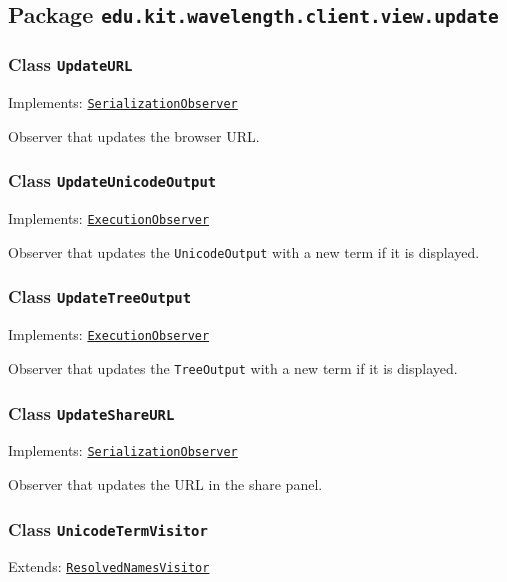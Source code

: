 \subsection{Package \lstinline{edu.kit.wavelength.client.view.update}}
\label{pkg:edu.kit.wavelength.client.view.update}


\subsubsection{Class \texttt{UpdateURL}}
\label{type:edu.kit.wavelength.client.view.update.UpdateURL}
Implements: \texttt{\hyperref[type:edu.kit.wavelength.client.view.SerializationObserver]{SerializationObserver}}

Observer that updates the browser URL.

\subsubsection{Class \texttt{UpdateUnicodeOutput}}
\label{type:edu.kit.wavelength.client.view.update.UpdateUnicodeOutput}
Implements: \texttt{\hyperref[type:edu.kit.wavelength.client.view.execution.ExecutionObserver]{ExecutionObserver}}

Observer that updates the \texttt{UnicodeOutput} with a new term if it is displayed.

\subsubsection{Class \texttt{UpdateTreeOutput}}
\label{type:edu.kit.wavelength.client.view.update.UpdateTreeOutput}
Implements: \texttt{\hyperref[type:edu.kit.wavelength.client.view.execution.ExecutionObserver]{ExecutionObserver}}

Observer that updates the \texttt{TreeOutput} with a new term if it is displayed.

\subsubsection{Class \texttt{UpdateShareURL}}
\label{type:edu.kit.wavelength.client.view.update.UpdateShareURL}
Implements: \texttt{\hyperref[type:edu.kit.wavelength.client.view.SerializationObserver]{SerializationObserver}}

Observer that updates the URL in the share panel.

\subsubsection{Class \texttt{UnicodeTermVisitor}}
\label{type:edu.kit.wavelength.client.view.update.UnicodeTermVisitor}
Extends: \texttt{\hyperref[type:edu.kit.wavelength.client.model.term.ResolvedNamesVisitor]{ResolvedNamesVisitor}}

